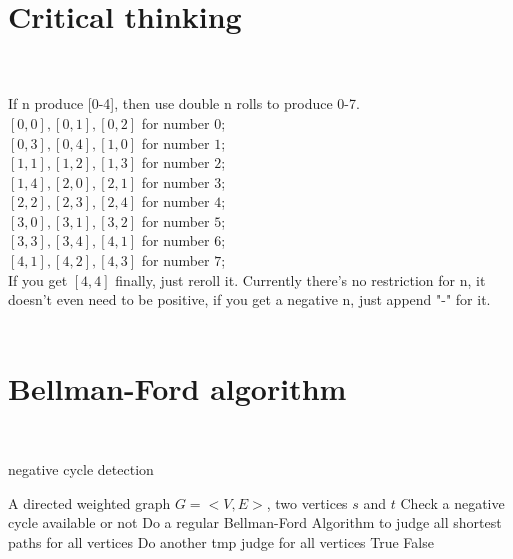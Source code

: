 \documentclass{article}
\begin{document}
\section{Critical thinking}
\\\\
If n produce [0-4], then use double n rolls to produce 0-7.
\\${[0,0],[0,1],[0,2]}$ for number $0$;
\\${[0,3],[0,4],[1,0]}$ for number $1$;
\\${[1,1],[1,2],[1,3]}$ for number $2$;
\\${[1,4],[2,0],[2,1]}$ for number $3$;
\\${[2,2],[2,3],[2,4]}$ for number $4$;
\\${[3,0],[3,1],[3,2]}$ for number $5$;
\\${[3,3],[3,4],[4,1]}$ for number $6$;
\\${[4,1],[4,2],[4,3]}$ for number $7$;
\\If you get $[4, 4]$ finally, just reroll it.
Currently there's no restriction for n, it doesn't even need to be positive, if you get a negative n, just append "-" for it.
\\\\
\clearpage
\section{Bellman-Ford algorithm}
\\
\begin{algorithm}
    \caption{negative cycle detection}
    \begin{algorithmic}[1]
    \Require A directed weighted graph $G =<V, E>$, two vertices $s$ and $t$ 
    \Ensure Check a negative cycle available or not
    \State Do a regular Bellman-Ford Algorithm to judge all shortest paths for all vertices
    \State Do another tmp judge for all vertices
    \State \Return True
    \Else  \Return False
    \EndIf
    \end{algorithmic}
\end{algorithm}
\clearpage
\end{document}
